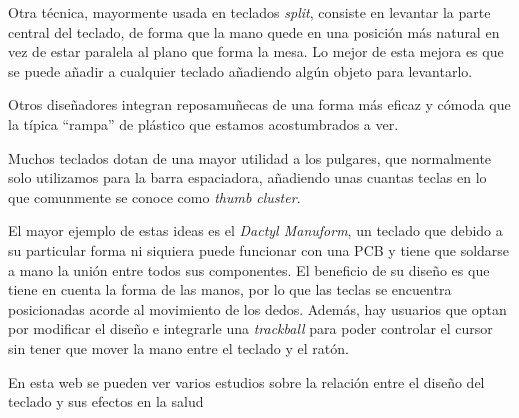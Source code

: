 Otra técnica, mayormente usada en teclados \textit{split}, consiste en levantar la parte central del teclado, de forma que la mano quede en una posición más natural en vez de estar paralela al plano que forma la mesa. Lo mejor de esta mejora es que se puede añadir a cualquier teclado añadiendo algún objeto para levantarlo.

Otros diseñadores integran reposamuñecas de una forma más eficaz y cómoda que la típica ``rampa'' de plástico que estamos acostumbrados a ver.

Muchos teclados dotan de una mayor utilidad a los pulgares, que normalmente solo utilizamos para la barra espaciadora, añadiendo unas cuantas teclas en lo que comunmente se conoce como \textit{thumb cluster}.

El mayor ejemplo de estas ideas es el \textit{Dactyl Manuform}, un teclado que debido a su particular forma ni siquiera puede funcionar con una PCB y tiene que soldarse a mano la unión entre todos sus componentes. El beneficio de su diseño es que tiene en cuenta la forma de las manos, por lo que las teclas se encuentra posicionadas acorde al movimiento de los dedos. Además, hay usuarios que optan por modificar el diseño e integrarle una \textit{trackball} para poder controlar el cursor sin tener que mover la mano entre el teclado y el ratón.
\label{img:dactyl}

\vspace*{\fill}
\hr
En esta web\cite{paper} se pueden ver varios estudios sobre la relación entre el diseño del teclado y sus efectos en la salud
